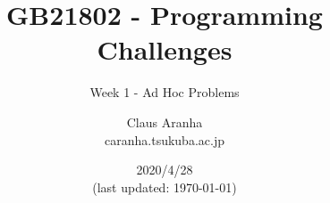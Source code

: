 \documentclass{beamer}
\title[Programming Challenges]{GB21802 - Programming Challenges}
\subtitle[Week 1]{Week 1 - Ad Hoc Problems}
\author[Claus Aranha]{Claus Aranha\\{\footnotesize caranha\@@cs.tsukuba.ac.jp}}
\institute[]{Department of Computer Science}
\date[2020/4/28]{2020/4/28\\{\smaller(last updated: \today)}}
\begin{document}
\begin{CJK}{UTF8}{ipxm}

\begin{frame}
\maketitle
\end{frame}





\end{CJK}
\end{document}
